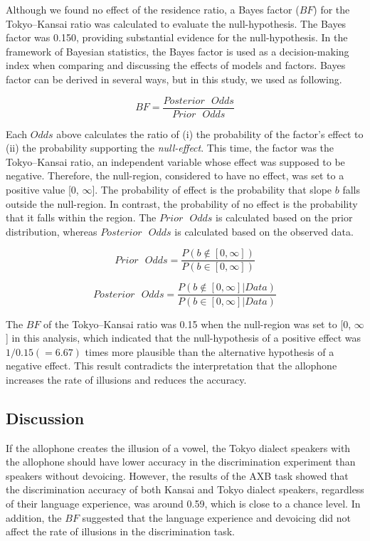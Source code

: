 \documentclass[a4paper,11pt,twocolumn]{article}
\begin{document}
Although we found no effect of the residence ratio, a Bayes factor ($BF$) for the Tokyo--Kansai ratio was calculated to evaluate the null-hypothesis. The Bayes factor was 0.150, providing substantial evidence for the null-hypothesis. In the framework of Bayesian statistics, the Bayes factor is used as a decision-making index when comparing and discussing the effects of models and factors. Bayes factor can be derived in several ways, but in this study, we used as following.

$$
BF = \frac{Posterior \text{ }Odds }{Prior \text{ }Odds}
$$

Each $Odds$ above calculates the ratio of (i) the probability of the factor's effect to (ii) the probability supporting the \textit{null-effect}\cite{kruschke2010believe}. This time, the factor was the Tokyo--Kansai ratio, an independent variable whose effect was supposed to be negative. Therefore, the null-region, considered to have no effect, was set to a positive value [0, $\infty$]. The probability of effect is the probability that slope $b$ falls outside the null-region. In contrast, the probability of no effect is the probability that it falls within the region. The $Prior \text{ }Odds$ is calculated based on the prior distribution, whereas $Posterior \text{ }Odds$ is calculated based on the observed data.

$$ Prior\text{ }Odds = \frac{P(b\notin[0, \infty])}{P(b\in[0, \infty])} $$

$$ Posterior \text{ }Odds = \frac{P(b\notin[0, \infty] | Data)}{P(b\in[0, \infty] | Data)} $$

The $BF$ of the Tokyo--Kansai ratio was 0.15 when the null-region was set to [0, $\infty$] in this analysis, which indicated that the null-hypothesis of a positive effect was $1/0.15(=6.67)$ times more plausible than the alternative hypothesis of a negative effect. This result contradicts the interpretation that the allophone increases the rate of illusions and reduces the accuracy.

\subsection{Discussion}

If the allophone creates the illusion of a vowel, the Tokyo dialect speakers with the allophone should have lower accuracy in the discrimination experiment than speakers without devoicing. However, the results of the AXB task showed that the discrimination accuracy of both Kansai and Tokyo dialect speakers, regardless of their language experience, was around 0.59, which is close to a chance level. In addition, the $BF$ suggested that the language experience and devoicing did not affect the rate of illusions in the discrimination task.
\end{document}
